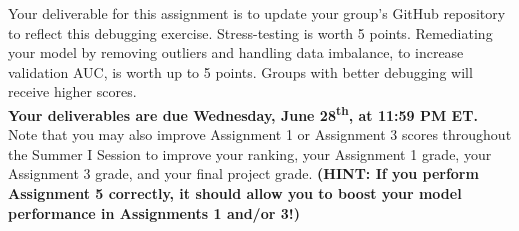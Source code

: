 \documentclass[fleqn]{article}
\begin{document}
Your deliverable for this assignment is to update your group's GitHub repository to reflect this debugging exercise. Stress-testing is worth 5 points. Remediating your model by removing outliers and handling data imbalance, to increase validation AUC, is worth up to 5 points. Groups with better debugging will receive higher scores. \\

\noindent \textbf{Your deliverables are due Wednesday, June 28\textsuperscript{th}, at 11:59 PM ET.}\\

\noindent Note that you may also improve Assignment 1 or Assignment 3 scores throughout the Summer I Session to improve your ranking, your Assignment 1 grade, your Assignment 3 grade, and your final project grade. \textbf{(HINT: If you perform Assignment 5 correctly, it should allow you to boost your model performance in Assignments 1  and/or 3!)}
\end{document}
